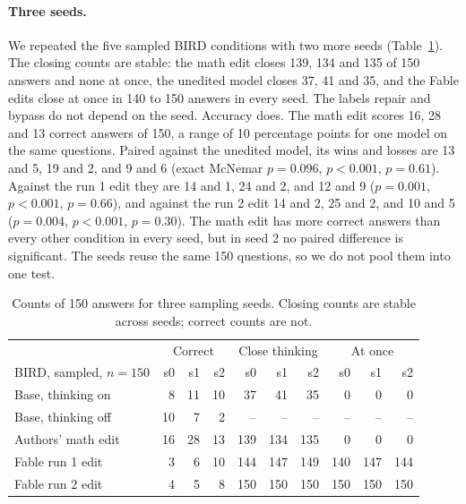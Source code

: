 \documentclass[11pt]{article}
\begin{document}
\paragraph{Three seeds.} We repeated the five sampled BIRD conditions with two more seeds (Table~\ref{tab:seeds}). The closing counts are stable: the math edit closes 139, 134 and 135 of 150 answers and none at once, the unedited model closes 37, 41 and 35, and the Fable edits close at once in 140 to 150 answers in every seed. The labels repair and bypass do not depend on the seed. Accuracy does. The math edit scores 16, 28 and 13 correct answers of 150, a range of 10 percentage points for one model on the same questions. Paired against the unedited model, its wins and losses are 13 and 5, 19 and 2, and 9 and 6 (exact McNemar $p = 0.096$, $p < 0.001$, $p = 0.61$). Against the run 1 edit they are 14 and 1, 24 and 2, and 12 and 9 ($p = 0.001$, $p < 0.001$, $p = 0.66$), and against the run 2 edit 14 and 2, 25 and 2, and 10 and 5 ($p = 0.004$, $p < 0.001$, $p = 0.30$). The math edit has more correct answers than every other condition in every seed, but in seed 2 no paired difference is significant. The seeds reuse the same 150 questions, so we do not pool them into one test.

\begin{table}[h]\centering\small
\begin{tabular}{lrrrrrrrrr}
\toprule
 & \multicolumn{3}{c}{Correct} & \multicolumn{3}{c}{Close thinking} & \multicolumn{3}{c}{At once} \\
BIRD, sampled, $n{=}150$ & s0 & s1 & s2 & s0 & s1 & s2 & s0 & s1 & s2 \\
\midrule
Base, thinking on & 8 & 11 & 10 & 37 & 41 & 35 & 0 & 0 & 0 \\
Base, thinking off & 10 & 7 & 2 & -- & -- & -- & -- & -- & -- \\
Authors' math edit & 16 & 28 & 13 & 139 & 134 & 135 & 0 & 0 & 0 \\
Fable run 1 edit & 3 & 6 & 10 & 144 & 147 & 149 & 140 & 147 & 144 \\
Fable run 2 edit & 4 & 5 & 8 & 150 & 150 & 150 & 150 & 150 & 150 \\
\bottomrule
\end{tabular}
\caption{Counts of 150 answers for three sampling seeds. Closing counts are stable across seeds; correct counts are not.}
\label{tab:seeds}
\end{table}
\end{document}
